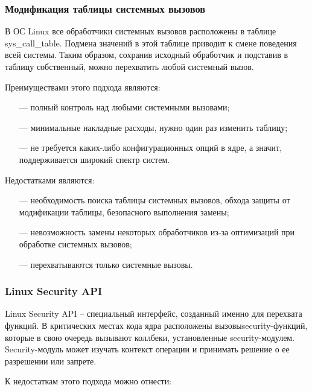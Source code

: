 \subsubsection{Модификация таблицы системных вызовов}

В ОС Linux все обработчики системных вызовов расположены в таблице sys\_call\_table. Подмена значений в этой таблице \cite{ways} приводит к смене поведения всей системы. Таким образом, сохранив исходный обработчик и подставив в таблицу собственный, можно перехватить любой системный вызов.

Преимуществами этого подхода являются:

\begin{itemize}[leftmargin=0.7cm +  - ]
	\item[---] полный контроль над любыми системными вызовами;
	\item[---] минимальные накладные расходы, нужно один раз изменить таблицу;
	\item[---] не требуется каких-либо конфигурационных опций в ядре, а значит, поддерживается широкий спектр систем.
\end{itemize}

Недостатками являются:

\begin{itemize}[leftmargin=0.7cm +  - ]
	\item[---] необходимость поиска таблицы системных вызовов, обхода защиты от модификации таблицы, безопасного выполнения замены;
	\item[---] невозможность замены некоторых обработчиков из-за оптимизаций при обработке системных вызовов;
	\item[---] перехватываются только системные вызовы.
\end{itemize}

\subsubsection{Linux Security API}

Linux Security API \cite{hookftr} -- специальный интерфейс, созданный именно для перехвата функций. В критических местах кода ядра расположены вызовы\newline security-функций, которые в свою очередь вызывают коллбеки, установленные security-модулем. Security-модуль может изучать контекст операции и принимать решение о ее разрешении или запрете.

К недостаткам этого подхода можно отнести:

